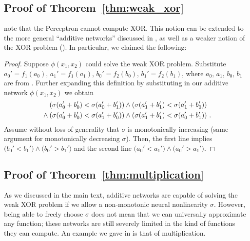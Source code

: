 \subsection{Proof of Theorem~\ref{thm:weak_xor}}

 note that the Perceptron cannot compute XOR.
This notion can be extended to the more general \enquote{additive networks} discussed in , as well as a weaker notion of the XOR problem ().
In particular, we claimed the following:

\ThmWeakXor*

\begin{proof}
Suppose $\phi(x_1, x_2)$ could solve the weak XOR problem. Substitute $a_0' = f_1(a_0)$, $a_1' = f_1(a_1)$, $b_0' = f_2(b_0)$, $b_1' = f_2(b_1)$, where $a_0$, $a_1$, $b_0$, $b_1$ are from .
Further expanding this definition by substituting in our additive network $\phi(x_1, x_2)$ we obtain
	\begin{align*}
	&\hphantom{\wedge} \;    \left( \sigma(a_0' + b_0') < \sigma(a_0' + b_1') \right)
	 \wedge   \left( \sigma(a_1' + b_1') < \sigma(a_1' + b_0') \right) \\
	&\wedge   \left( \sigma(a_0' + b_0') < \sigma(a_1' + b_0') \right) 
	 \wedge   \left( \sigma(a_1' + b_1') < \sigma(a_0' + b_1') \right) \,.
	\end{align*}
	Assume without loss of generality that $\sigma$ is monotonically increasing (same argument for monotonically decreasing $\sigma$). Then, the first line implies $\big(b_0' < b_1' \big) \wedge \big( b_0' > b_1' \big)$ and the second line $\big(a_0' < a_1' \big) \wedge \big( a_0' > a_1' \big)$. \Lightning
\end{proof}

\subsection{Proof of Theorem~\ref{thm:multiplication}}

As we discussed in the main text, additive networks are capable of solving the weak XOR problem if we allow a non-monotonic neural nonlinearity $\sigma$.
However, being able to freely choose $\sigma$ does not mean that we can universally approximate any function; these networks are still severely limited in the kind of functions they can compute.
An example we gave in  is that of multiplication.

\ThmMultiplication*


